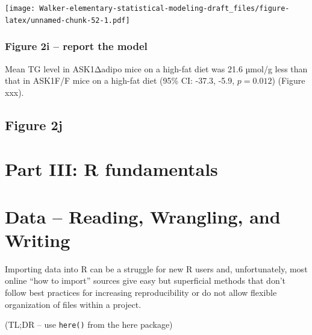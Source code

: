 \documentclass[]{book}
\newenvironment{Shaded}{\begin{snugshade}}{\end{snugshade}}
\newcommand{\NormalTok}[1]{#1}
\begin{document}
\begin{Shaded}
\begin{Highlighting}[]
{\NormalTok{fig_2i_gg}
\end{Highlighting}
\end{Shaded}

\texttt{[image: Walker-elementary-statistical-modeling-draft\_files/figure-latex/unnamed-chunk-52-1.pdf]}

\hypertarget{figure-2i-report-the-model}{%
\subsection{Figure 2i -- report the model}\label{figure-2i-report-the-model}}

Mean TG level in ASK1Δadipo mice on a high-fat diet was 21.6 µmol/g less than that in ASK1F/F mice on a high-fat diet (95\% CI: -37.3, -5.9, \(p = 0.012\)) (Figure xxx).

\hypertarget{figure-2j}{%
\section{Figure 2j}\label{figure-2j}}

\hypertarget{part-iii-r-fundamentals}{%
\chapter*{Part III: R fundamentals}\label{part-iii-r-fundamentals}}

\hypertarget{data-reading-wrangling-and-writing}{%
\chapter{Data -- Reading, Wrangling, and Writing}\label{data-reading-wrangling-and-writing}}

Importing data into R can be a struggle for new R users and, unfortunately, most online ``how to import'' sources give easy but superficial methods that don't follow best practices for increasing reproducibility or do not allow flexible organization of files within a project.

(TL;DR -- use \texttt{here()} from the here package)
\end{document}
